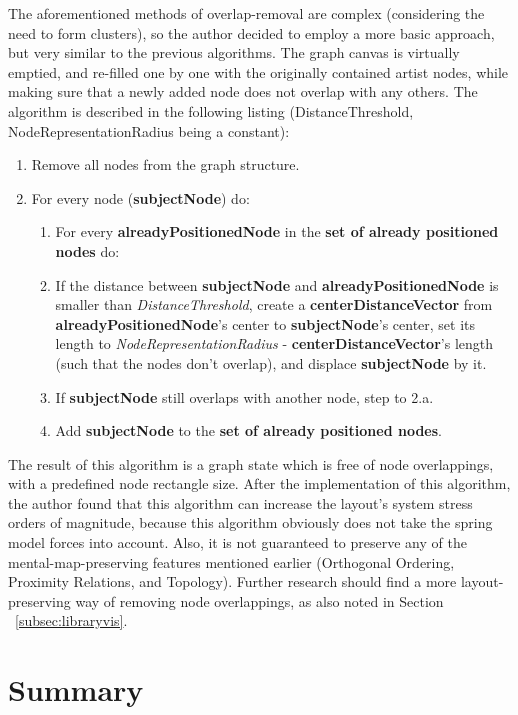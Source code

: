 The aforementioned methods of overlap-removal are complex (considering the need to form clusters), so the author decided to employ a more basic approach, but very similar to the previous algorithms. The graph canvas is virtually emptied, and re-filled one by one with the originally contained artist nodes, while making sure that a newly added node does not overlap with any others. The algorithm is described in the following listing (DistanceThreshold, NodeRepresentationRadius being a constant):

\begin{enumerate}
\item Remove all nodes from the graph structure.	
\item For every node (\textbf{subjectNode}) do:
	\begin{enumerate}
		\item For every \textbf{alreadyPositionedNode} in the \textbf{set of already positioned nodes} do:
		\item If the distance between \textbf{subjectNode} and \textbf{alreadyPositionedNode} is smaller than \emph{DistanceThreshold}, create a \textbf{centerDistanceVector} from \textbf{alreadyPositionedNode}'s center to \textbf{subjectNode}'s center, set
		its length to \emph{NodeRepresentationRadius} - \textbf{centerDistanceVector}'s length (such that the nodes don't overlap), and displace \textbf{subjectNode} by it.
		\item If \textbf{subjectNode} still overlaps with another node, step to 2.a.
		\item Add \textbf{subjectNode} to the \textbf{set of already positioned nodes}.
	\end{enumerate}
\end{enumerate}

The result of this algorithm is a graph state which is free of node overlappings, with a predefined node rectangle size. After the implementation of this algorithm, the author found that this algorithm can increase the layout's system stress orders of magnitude, because this algorithm obviously does not take the spring model forces into account. Also, it is not guaranteed to preserve any of the mental-map-preserving features mentioned earlier (Orthogonal Ordering, Proximity Relations, and Topology). Further research should find a more layout-preserving way of removing node overlappings, as also noted in Section ~\ref{subsec:libraryvis}.

\section{Summary}

